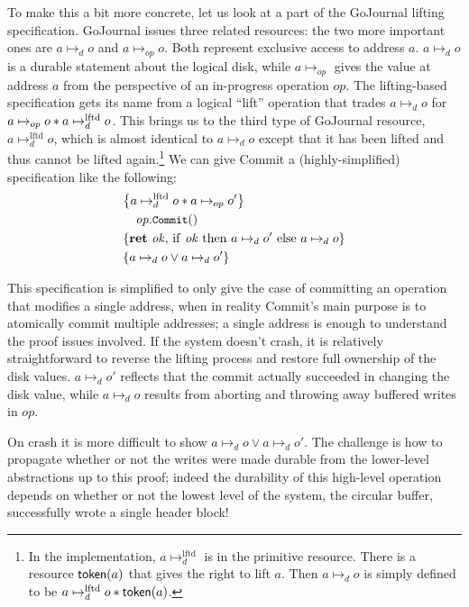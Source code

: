 To make this a bit more concrete, let us look at a part of the GoJournal lifting
specification. GoJournal issues three related resources: the two more important
ones are $a \mapsto_{d} o$ and $a \mapsto_{op} o$. Both represent exclusive
access to address $a$. $a \mapsto_{d} o$ is a durable statement about the
logical disk, while $a \mapsto_{op}$ gives the value at address $a$ from the
perspective of an in-progress operation $op$. The lifting-based specification
gets its name from a logical ``lift'' operation that trades $a \mapsto_{d} o$
for $a \mapsto_{op} o * a \mapsto_d^{\mathrm{lftd}} o$. This brings us to the
third type of GoJournal resource, $a \mapsto_{d}^{\mathrm{lftd}} o$, which is
almost identical to $a \mapsto_{d} o$ except that it has been lifted and thus
cannot be lifted again.\footnote{In the implementation,
$a \mapsto_{d}^{\mathrm{lftd}}$ is in the primitive resource. There is a
resource $\textsf{\upshape token}(a)$ that gives the right to lift $a$. Then
$a \mapsto_{d} o$ is simply defined to be
$a \mapsto_{d}^{\mathrm{lftd}} o * \textsf{\upshape token}(a)$.} We can give Commit a
(highly-simplified) specification like the following:
%
\begin{align*}
  \hoareCV{a \mapsto_{d}^{\mathrm{lftd}} o \sep a \mapsto_{op} o'} %
  {\mathit{op}.\cc{Commit}()}%
  {\Ret{\mathit{ok}} \mathrm{if~} \mathit{ok} %
  \mathrm{~then~} a \mapsto_{d} o' \mathrm{~else~} a \mapsto_{d} o}%
  {a \mapsto_{d} o \lor a \mapsto_{d} o'}
\end{align*}

This specification is simplified to only give the case of committing an
operation that modifies a single address, when in reality Commit's main purpose
is to atomically commit multiple addresses; a single address is enough to
understand the proof issues involved. If the system doesn't crash, it is
relatively straightforward to reverse the lifting process and restore full
ownership of the disk values. $a \mapsto_{d} o'$ reflects that the commit
actually succeeded in changing the disk value, while $a \mapsto_{d} o$ results
from aborting and throwing away buffered writes in $op$.

On crash it is more difficult to show $a \mapsto_{d} o \lor a \mapsto_{d} o'$.
The challenge is how to propagate whether or not the writes were made durable
from the lower-level abstractions up to this proof; indeed the durability of
this high-level operation depends on whether or not the lowest level of the
system, the circular buffer, successfully wrote a single header block!

